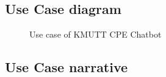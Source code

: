 \documentclass[12pt,oneside,openright,a4paper]{cpe-english-project}
\begin{document}
	\subsection{Use Case diagram}
	\begin{figure}[!h]\centering
		\caption{Use case of KMUTT CPE Chatbot}\label{fig:Use case of KMUTT CPE Chatbot version2}
	\end{figure}
\pagebreak
	\subsection{Use Case narrative}
\end{document}
